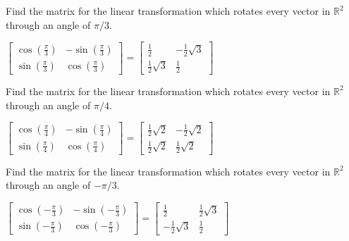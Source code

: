 \documentclass{ximera}
\begin{document}
\begin{problem}\label{prb:6.11}  Find the matrix for the linear transformation which
rotates every vector in $\mathbb{R}^{2}$ through an angle of $\pi /3.$
\begin{hint}
$\left[
\begin{array}{cc}
\cos \left(
\frac{\pi }{3}\right) & -\sin \left( \frac{\pi }{3}\right) \\
\sin \left( \frac{\pi }{3}\right) & \cos \left( \frac{\pi }{3}\right)%
\end{array}
\right] = \left[
\begin{array}{cc}
\frac{1}{2} & -\frac{1}{2}\sqrt{3} \\
\frac{1}{2}\sqrt{3} & \frac{1}{2}
\end{array}
\right] $
\end{hint}
\end{problem}


\begin{problem}\label{prb:6.12} Find the matrix for the linear transformation which rotates every
vector in $\mathbb{R}^{2}$ through an angle of $\pi /4.$
\begin{hint}
$\left[
\begin{array}{cc}
\cos \left( \frac{\pi }{4}\right) & -\sin \left( \frac{\pi }{4}\right) \\
\sin \left( \frac{\pi }{4}\right) & \cos \left( \frac{\pi }{4}\right)
\end{array}
\right] = \left[
\begin{array}{cc}
\frac{1}{2}\sqrt{2} & -\frac{1}{2}\sqrt{2} \\
\frac{1}{2}\sqrt{2} & \frac{1}{2}\sqrt{2}
\end{array}
\right] $
\end{hint}
\end{problem}

\begin{problem}\label{prb:6.13} Find the matrix for the linear transformation which rotates every
vector in $\mathbb{R}^{2}$ through an angle of $-\pi /3.$
\begin{hint}
$\left[
\begin{array}{cc}
\cos \left( -\frac{\pi }{3}\right) & -\sin \left( -\frac{\pi }{3}\right) \\
\sin \left( -\frac{\pi }{3}\right) & \cos \left( -\frac{\pi }{3}\right)
\end{array}
\right] = \left[
\begin{array}{cc}
\frac{1}{2} & \frac{1}{2}\sqrt{3} \\
-\frac{1}{2}\sqrt{3} & \frac{1}{2}
\end{array}
\right] $
\end{hint}
\end{problem}
\end{document}
